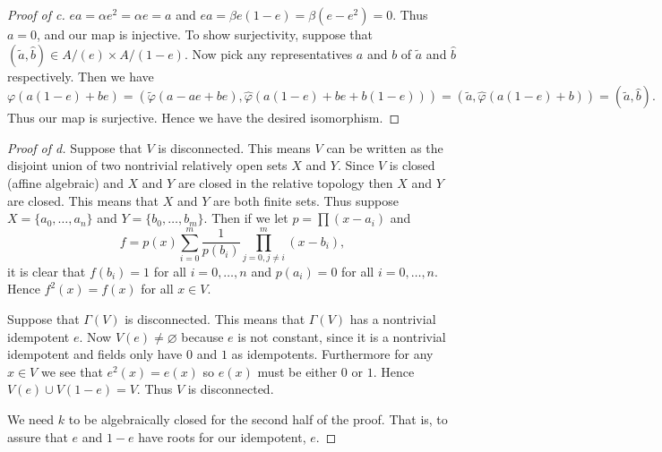 \documentclass{article}
\begin{document}
\begin{problem}[Irreducibility]
\begin{proof}[Proof of c]
    $ea=\alpha e^2=\alpha e =a$ and $ea=\beta e(1-e)=\beta(e-e^2)=0$. Thus
    $a=0$, and our map is injective. To show surjectivity, suppose that
    $(\tilde{a},\hat{b})\in A/(e)\times A/(1-e)$. Now pick any representatives
    $a$ and $b$ of $\tilde{a}$ and $\hat{b}$ respectively. Then we have
    \[\varphi(a(1-e)+be)=(\tilde{\varphi}(a-ae+be),\hat{\varphi}(a(1-e)+be+b(1-e)))
    =(\tilde{a},\hat{\varphi}(a(1-e)+b))=(\tilde{a},\hat{b}).\]
    Thus our map is surjective. Hence we have the desired isomorphism.
  \end{proof}
  \begin{proof}[Proof of d]
    Suppose that $V$ is disconnected. This means $V$ can be written as the
    disjoint union of two nontrivial relatively open sets $X$ and $Y$. 
    Since $V$ is closed (affine algebraic)
    and $X$ and $Y$ are closed in the relative topology then $X$ and $Y$
    are closed. This means that $X$ and $Y$ are both finite sets. Thus suppose
    $X=\{a_0,\dots,a_n\}$ and $Y=\{b_0,\dots,b_m\}$. Then if we let 
    $p=\prod (x-a_i)$ and 
    \[f=p(x)\sum_{i=0}^m\frac{1}{p(b_i)}\prod_{j=0,j\ne i}^m(x-b_i),\]
    it is clear that $f(b_i)=1$ for all $i=0,\dots,n$ and $p(a_i)=0$ for all
    $i=0,\dots,n$. Hence $f^2(x)=f(x)$ for all $x\in V$.

    Suppose that $\Gamma(V)$ is disconnected. This means that
    $\Gamma(V)$ has a nontrivial idempotent $e$. 
    Now $V(e)\ne\varnothing$ because $e$ is
    not constant, since it is a nontrivial idempotent and fields only have $0$
    and $1$ as idempotents. Furthermore for any $x\in V$ we see that
    $e^2(x)=e(x)$ so $e(x)$ must be either $0$ or $1$. Hence $V(e)\cup
    V(1-e)=V$. Thus $V$ is disconnected.

    We need $k$ to be algebraically closed for the second half of the proof.
    That is, to assure that $e$ and $1-e$ have roots for our idempotent, $e$.
  \end{proof}
\end{problem}
\end{document}
